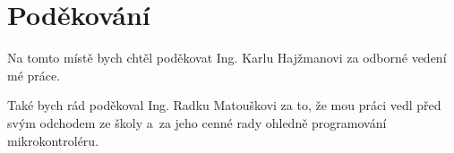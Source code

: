 \section*{Poděkování}
Na tomto místě bych chtěl poděkovat Ing. Karlu Hajžmanovi za odborné vedení
mé práce.

Také bych rád poděkoval Ing. Radku Matouškovi za to, že mou práci vedl před
svým odchodem ze školy a~za jeho cenné rady ohledně programování
mikrokontroléru.
